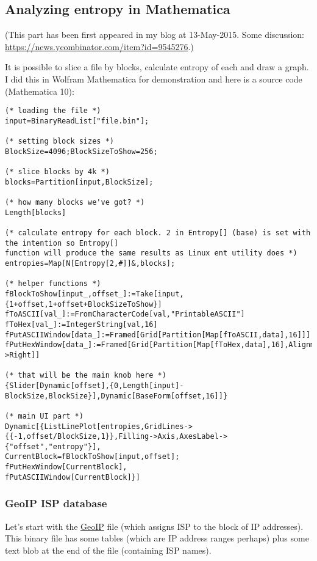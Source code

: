 \subsection{Analyzing entropy in Mathematica}
\newcommand{\EntropyGfxScale}{0.8\textwidth}

(This part has been first appeared in my blog at 13-May-2015.
Some discussion: \url{https://news.ycombinator.com/item?id=9545276}.)

It is possible to slice a file by blocks, calculate entropy of each and draw a graph.
I did this in Wolfram Mathematica for demonstration and here is a source code (Mathematica 10):

\begin{lstlisting}[style=custommath]
(* loading the file *)
input=BinaryReadList["file.bin"];

(* setting block sizes *)
BlockSize=4096;BlockSizeToShow=256;

(* slice blocks by 4k *)
blocks=Partition[input,BlockSize];

(* how many blocks we've got? *)
Length[blocks]

(* calculate entropy for each block. 2 in Entropy[] (base) is set with the intention so Entropy[] 
function will produce the same results as Linux ent utility does *)
entropies=Map[N[Entropy[2,#]]&,blocks];

(* helper functions *)
fBlockToShow[input_,offset_]:=Take[input,{1+offset,1+offset+BlockSizeToShow}]
fToASCII[val_]:=FromCharacterCode[val,"PrintableASCII"]
fToHex[val_]:=IntegerString[val,16]
fPutASCIIWindow[data_]:=Framed[Grid[Partition[Map[fToASCII,data],16]]]
fPutHexWindow[data_]:=Framed[Grid[Partition[Map[fToHex,data],16],Alignment->Right]]

(* that will be the main knob here *)
{Slider[Dynamic[offset],{0,Length[input]-BlockSize,BlockSize}],Dynamic[BaseForm[offset,16]]}

(* main UI part *)
Dynamic[{ListLinePlot[entropies,GridLines->{{-1,offset/BlockSize,1}},Filling->Axis,AxesLabel->{"offset","entropy"}],
CurrentBlock=fBlockToShow[input,offset];
fPutHexWindow[CurrentBlock],
fPutASCIIWindow[CurrentBlock]}]
\end{lstlisting}

\subsubsection{GeoIP ISP database}

Let's start with the \href{https://www.maxmind.com/en/geoip-demo}{GeoIP} file (which assigns ISP to the block of IP addresses).
This binary file  has some tables (which are IP address ranges perhaps)
plus some text blob at the end of the file (containing ISP names).

